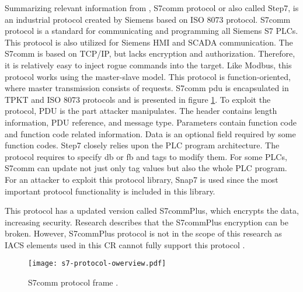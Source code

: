 Summarizing relevant information from \parencite{WEB-12-wshark-s7comm, WEB-13-s7comm-blog-explained, WEB-23-s7comm-blog-part2, 56-Rogue7-Attacks-On-S7-Simatic-PLC, WEB-24-snap7-documentation-s7comm}, S7comm protocol or also called Step7, is an industrial protocol created by Siemens based on ISO 8073 \parencite{WEB-29-s7comm-wireshark} protocol. S7comm protocol is a standard for communicating and programming all Siemens S7 PLCs. This protocol is also utilized for Siemens HMI and SCADA communication. The S7comm is based on TCP/IP, but lacks encryption and authorization. Therefore, it is relatively easy to inject rogue commands into the target. Like Modbus, this protocol works using the master-slave model. This protocol is function-oriented, where master transmission consists of requests. S7comm \gls*{pdu} is encapsulated in TPKT and ISO 8073 \parencite{WEB-29-s7comm-wireshark} protocols and is presented in figure \ref{fig:s7-protocol-owerview}.  To exploit the protocol, PDU is the part attacker manipulates. The header contains length information, PDU reference, and message type. Parameters contain function code and function code related information. Data is an optional field required by some function codes. Step7 closely relies upon the PLC program architecture. The protocol requires to specify \gls*{db} or \gls*{fb} and tags to modify them. For some PLCs, S7comm can update not just only tag values but also the whole PLC program. For an attacker to exploit this protocol library, Snap7 \parencite{WEB-24-snap7-documentation-s7comm} is used since the most important protocol functionality is included in this library.

This protocol has a updated version called S7commPlus, which encrypts the data, increasing security. Research \parencite{101-s7comm-plus-breaking} describes that the S7commPlus encryption can be broken. However, S7commPlus protocol is not in the scope of this research as IACS elements used in this CR cannot fully support this protocol \parencite{WEB-12-wshark-s7comm, WEB-13-s7comm-blog-explained, 83-exploit-siemens-s7}.

\begin{figure}
	\texttt{[image: s7-protocol-owerview.pdf]}
	\caption{S7comm protocol frame \parencite{WEB-13-s7comm-blog-explained, WEB-23-s7comm-blog-part2}.}
	\label{fig:s7-protocol-owerview}
\end{figure}
